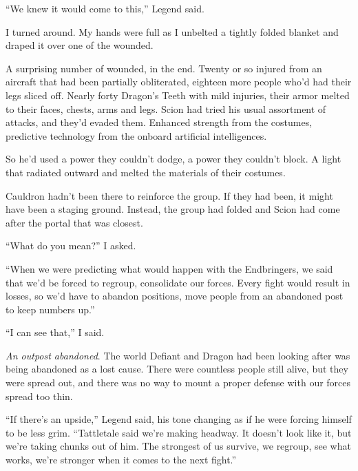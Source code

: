 





``We knew it would come to this,'' Legend said.



I turned around.  My hands were full as I unbelted a tightly folded blanket and draped it over one of the wounded.



A surprising number of wounded, in the end.  Twenty or so injured from an aircraft that had been partially obliterated, eighteen more people who'd had their legs sliced off.  Nearly forty Dragon's Teeth with mild injuries, their armor melted to their faces, chests, arms and legs.  Scion had tried his usual assortment of attacks, and they'd evaded them.  Enhanced strength from the costumes, predictive technology from the onboard artificial intelligences.



So he'd used a power they couldn't dodge, a power they couldn't block.  A light that radiated outward and melted the materials of their costumes.



Cauldron hadn't been there to reinforce the group.  If they had been, it might have been a staging ground.  Instead, the group had folded and Scion had come after the portal that was closest.



``What do you mean?'' I asked.



``When we were predicting what would happen with the Endbringers, we said that we'd be forced to regroup, consolidate our forces.  Every fight would result in losses, so we'd have to abandon positions, move people from an abandoned post to keep numbers up.''



``I can see that,'' I said.



\emph{An outpost abandoned}.  The world Defiant and Dragon had been looking after was being abandoned as a lost cause.  There were countless people still alive, but they were spread out, and there was no way to mount a proper defense with our forces spread too thin.



``If there's an upside,'' Legend said, his tone changing as if he were forcing himself to be less grim.  ``Tattletale said we're making headway.  It doesn't look like it, but we're taking chunks out of him.  The strongest of us survive, we regroup, see what works, we're stronger when it comes to the next fight.''



